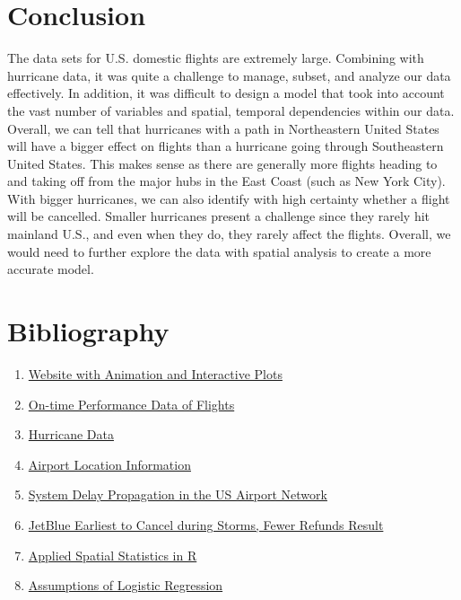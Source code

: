 \documentclass[12pt]{article}
\begin{document}
\section{Conclusion} \label{sec:Conclusion}
The data sets for U.S. domestic flights are extremely large. Combining with hurricane data, it was quite a challenge to manage, subset, and analyze our data effectively. In addition, it was difficult to design a model that took into account the vast number of variables and spatial, temporal dependencies within our data. Overall, we can tell that hurricanes with a path in Northeastern United States will have a bigger effect on flights than a hurricane going through Southeastern United States. This makes sense as there are generally more flights heading to and taking off from the major hubs in the East Coast (such as New York City). With bigger hurricanes, we can also identify with high certainty whether a flight will be cancelled. Smaller hurricanes present a challenge since they rarely hit mainland U.S., and even when they do, they rarely affect the flights. Overall, we would need to further explore the data with spatial analysis to create a more accurate model.

\section{Bibliography} \label{sec:Bibliography}
\begin{enumerate}
\item \href{http://point.fungservices.com/flightanalysis}{Website with Animation and Interactive Plots}
\item 
\href{https://www.transtats.bts.gov/DL_SelectFields.asp?Table_ID=236&DB_Short_Name=On-Time}{On-time Performance Data of Flights}
\item \href{https://www.ncdc.noaa.gov/ibtracs/index.php?name=wmo-data}{Hurricane Data}
\item 
\href{https://raw.githubusercontent.com/jpatokal/openflights/master/data/airports.dat}{Airport Location Information}
\item \href{https://www.nature.com/articles/srep01159}{System Delay Propagation in the US Airport Network}
\item
\href{http://www.reuters.com/article/us-jetblue-airways-cancellation-analysis-idUSKBN0N50BF20150414}{ JetBlue Earliest to Cancel during Storms, Fewer Refunds Result}
\item 
\href{http://www.people.fas.harvard.edu/~zhukov/spatial.html}{Applied Spatial Statistics in R}
\item \href{http://www.statisticssolutions.com/assumptions-of-logistic-regression/}{Assumptions of Logistic Regression}
\end{enumerate}
\end{document}
